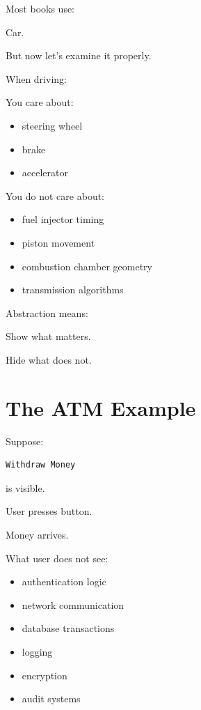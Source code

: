 \documentclass[11pt,a4paper]{book}
\begin{document}
Most books use:

Car.

But now let's examine it properly.


When driving:

You care about:

\begin{itemize}
\item steering wheel
\item brake
\item accelerator
\end{itemize}

You do not care about:

\begin{itemize}
\item fuel injector timing
\item piston movement
\item combustion chamber geometry
\item transmission algorithms
\end{itemize}


\begin{idea}

Abstraction means:

Show what matters.

Hide what does not.

\end{idea}


\section{The ATM Example}

Suppose:

\begin{verbatim}
Withdraw Money
\end{verbatim}

is visible.

User presses button.

Money arrives.


What user does not see:

\begin{itemize}
\item authentication logic
\item network communication
\item database transactions
\item logging
\item encryption
\item audit systems
\end{itemize}
\end{document}
